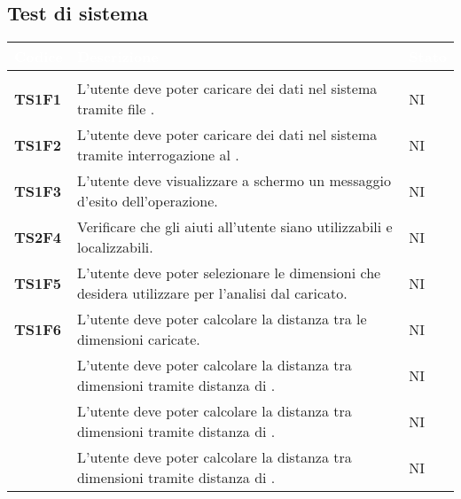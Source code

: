 \subsection{Test di sistema}

{
\renewcommand{\arraystretch}{1.5}
\renewcommand\extrarowheight{1.5pt}
\setlength\arrayrulewidth{1pt}
\begin{longtable}{ C{2cm} | C{12cm}| C{1.5cm} } 
		\textcolor{white}{\textbf{Codice}} & 
		\textcolor{white}{\textbf{Descrizione}} & 
		\textcolor{white}{\textbf{Stato}} \\
		\endfirsthead
		\\
	    \endfoot
	    \endlastfoot

\textbf{TS1F1} & 
L'utente deve poter caricare dei dati nel sistema tramite file . & 
NI\\

\textbf{TS1F2} & 
L'utente deve poter caricare dei dati nel sistema tramite interrogazione al . & 
NI\\

\textbf{TS1F3} & 
L'utente deve visualizzare a schermo un messaggio d'esito dell'operazione. & 
NI\\
		
\textbf{TS2F4} & 
Verificare che gli aiuti all'utente siano utilizzabili e localizzabili. & 
NI\\		

\textbf{TS1F5} & 
L'utente deve poter selezionare le dimensioni che desidera utilizzare per l'analisi dal  caricato. & 
NI\\	

\textbf{TS1F6} & 
L'utente deve poter calcolare la distanza tra le dimensioni caricate. & 
NI\\	

\textbf{} & 
L'utente deve poter calcolare la distanza tra dimensioni tramite distanza di \textit{}. & 
NI\\

\textbf{} & 
L'utente deve poter calcolare la distanza tra dimensioni tramite distanza di \textit{}. & 
NI\\

\textbf{} & 
L'utente deve poter calcolare la distanza tra dimensioni tramite distanza di \textit{}. & 
NI\\


\end{longtable}}
